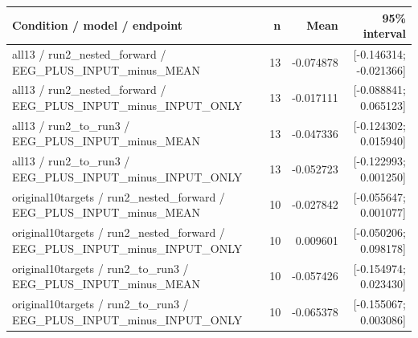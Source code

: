\begin{longtable}{p{.56\linewidth}rrr}
\toprule Condition / model / endpoint & n & Mean & 95\% interval\\\midrule
all13 / run2\_nested\_forward / EEG\_PLUS\_INPUT\_minus\_MEAN & 13 & -0.074878 & [-0.146314; -0.021366] \\
all13 / run2\_nested\_forward / EEG\_PLUS\_INPUT\_minus\_INPUT\_ONLY & 13 & -0.017111 & [-0.088841; 0.065123] \\
all13 / run2\_to\_run3 / EEG\_PLUS\_INPUT\_minus\_MEAN & 13 & -0.047336 & [-0.124302; 0.015940] \\
all13 / run2\_to\_run3 / EEG\_PLUS\_INPUT\_minus\_INPUT\_ONLY & 13 & -0.052723 & [-0.122993; 0.001250] \\
original10targets / run2\_nested\_forward / EEG\_PLUS\_INPUT\_minus\_MEAN & 10 & -0.027842 & [-0.055647; 0.001077] \\
original10targets / run2\_nested\_forward / EEG\_PLUS\_INPUT\_minus\_INPUT\_ONLY & 10 & 0.009601 & [-0.050206; 0.098178] \\
original10targets / run2\_to\_run3 / EEG\_PLUS\_INPUT\_minus\_MEAN & 10 & -0.057426 & [-0.154974; 0.023430] \\
original10targets / run2\_to\_run3 / EEG\_PLUS\_INPUT\_minus\_INPUT\_ONLY & 10 & -0.065378 & [-0.155067; 0.003086] \\
\bottomrule\end{longtable}
